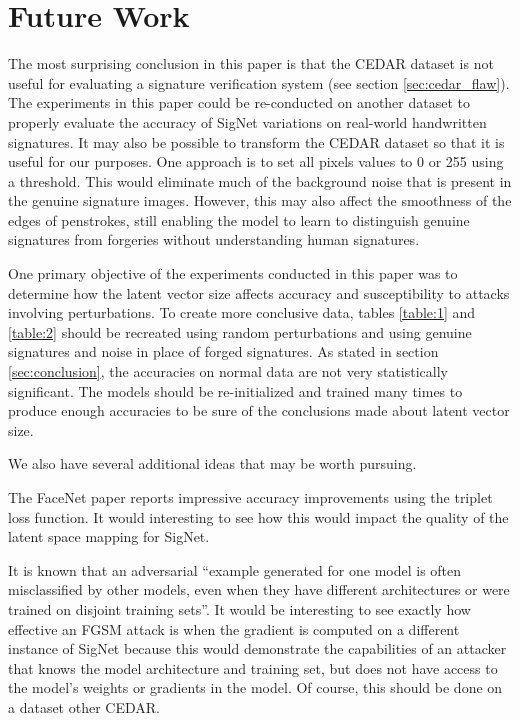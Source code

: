 \section{Future Work}\label{sec:future_work}

The most surprising conclusion in this paper is that the CEDAR dataset is not useful for evaluating a signature verification system (see section \ref{sec:cedar_flaw}).
The experiments in this paper could be re-conducted on another dataset to properly evaluate the accuracy of SigNet variations on real-world handwritten signatures.
It may also be possible to transform the CEDAR dataset so that it is useful for our purposes.
One approach is to set all pixels values to 0 or 255 using a threshold.
This would eliminate much of the background noise that is present in the genuine signature images.
However, this may also affect the smoothness of the edges of penstrokes, still enabling the model to learn to distinguish genuine signatures from forgeries without understanding human signatures.

One primary objective of the experiments conducted in this paper was to determine how the latent vector size affects accuracy and susceptibility to attacks involving perturbations.
To create more conclusive data, tables \ref{table:1} and \ref{table:2} should be recreated using random perturbations and using genuine signatures and noise in place of forged signatures.
As stated in section \ref{sec:conclusion}, the accuracies on normal data are not very statistically significant.
The models should be re-initialized and trained many times to produce enough accuracies to be sure of the conclusions made about latent vector size.

We also have several additional ideas that may be worth pursuing.

The FaceNet paper reports impressive accuracy improvements using the triplet loss function.
It would interesting to see how this would impact the quality of the latent space mapping for SigNet\cite{face_net}.

It is known that an adversarial ``example generated for one model is often misclassified by other models, even when they have different architectures or were trained on disjoint training sets''\cite{goodfellow}.
It would be interesting to see exactly how effective an FGSM attack is when the gradient is computed on a different instance of SigNet because this would demonstrate the capabilities of an attacker that knows the model architecture and training set, but does not have access to the model's weights or gradients in the model.
Of course, this should be done on a dataset other CEDAR.

